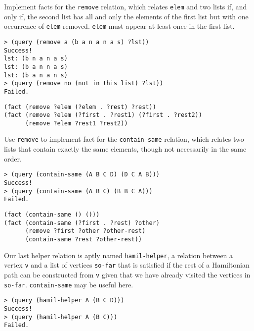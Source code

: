 \begin{questions}
\question
Implement facts for the {\tt remove} relation, which relates {\tt elem} and two
lists if, and only if, the second list has all and only the elements of the
first list but with one occurrence of {\tt elem} removed. {\tt elem} must
appear at least once in the first list.

\begin{lstlisting}
> (query (remove a (b a n a n a s) ?lst))
Success!
lst: (b n a n a s)
lst: (b a n n a s)
lst: (b a n a n s)
> (query (remove no (not in this list) ?lst))
Failed.
\end{lstlisting}

\begin{solution}[1.7in]
\begin{lstlisting}
(fact (remove ?elem (?elem . ?rest) ?rest))
(fact (remove ?elem (?first . ?rest1) (?first . ?rest2))
      (remove ?elem ?rest1 ?rest2))
\end{lstlisting}
\end{solution}

\newpage
\question
Use {\tt remove} to implement fact for the {\tt contain-same} relation, which
relates two lists that contain exactly the same elements, though not necessarily
in the same order.

\begin{lstlisting}
> (query (contain-same (A B C D) (D C A B)))
Success!
> (query (contain-same (A B C) (B B C A)))
Failed.
\end{lstlisting}

\begin{solution}[1.5in]
\begin{lstlisting}
(fact (contain-same () ()))
(fact (contain-same (?first . ?rest) ?other)
      (remove ?first ?other ?other-rest)
      (contain-same ?rest ?other-rest))
\end{lstlisting}
\end{solution}

\question
Our last helper relation is aptly named {\tt hamil-helper}, a relation between a
vertex {\tt v} and a list of vertices {\tt so-far} that is satisfied if the rest
of a Hamiltonian path can be constructed from {\tt v} given that we have already
visited the vertices in {\tt so-far}. {\tt contain-same} may be useful here.

\begin{lstlisting}
> (query (hamil-helper A (B C D)))
Success!
> (query (hamil-helper A (B C)))
Failed.
\end{lstlisting}


\end{questions}
